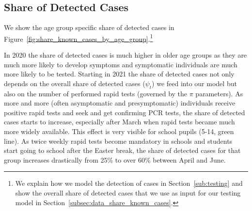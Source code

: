 \subsection{Share of Detected Cases}
\label{subsec:results_share_known_cases}

We show the age group specific share of detected cases in
Figure~\ref{fig:share_known_cases_by_age_group}.\footnote{We explain how we model the
detection of cases in Section~\ref{sub:testing} and show the overall share of detected
cases that we use as input for our testing model in
Section~\ref{subsec:data_share_known_cases}.}

In 2020 the share of detected cases is much higher in older age groups as they are much
more likely to develop symptoms and symptomatic individuals are much more likely to be
tested. Starting in 2021 the share of detected cases not only depends on the overall
share of detected cases ($\psi_t$) we feed into our model but also on the number of
performed rapid tests (governed by the $\pi$ parameters). As more and more (often
asymptomatic and presymptomatic) individuals receive positive rapid tests and seek and
get confirming PCR tests, the share of detected cases starts to increase, especially
after March when rapid tests became much more widely available. This effect is very
visible for school pupils (5-14, green line). As twice weekly rapid tests become
mandatory in schools and students start going to school after the Easter break, the share
of detected cases for that group increases drastically from 25\% to over 60\% between
April and June.

